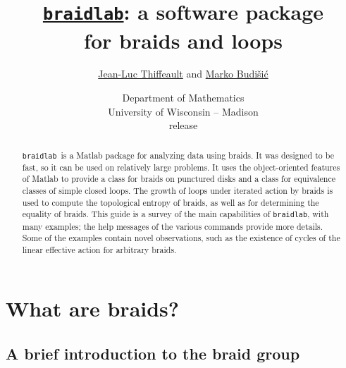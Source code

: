 \documentclass[12pt]{article}
\newcommand{\braidlab}{\texttt{braidlab}}%
\begin{document}

    {\lstset{frame=single,framerule=0pt}}
    {}

\lstset{style=braidlabStyle}


\title{\href{{https://github.com/jeanluct/braidlab}}{\braidlab}:
  a software package \\ for braids and loops}
\author{%
\href{https://people.math.wisc.edu/~thiffeault/}{Jean-Luc Thiffeault}
  and
\href{https://mbudisic.wordpress.com}{Marko Budi\v{s}i\'{c}}
}
\date{{\small Department of Mathematics\\ University of
    Wisconsin -- Madison} \\[10pt]
  release } %

\maketitle

\begin{abstract}
  \braidlab\ is a Matlab package for analyzing data using braids.  It was
  designed to be fast, so it can be used on relatively large problems.  It
  uses the object-oriented features of Matlab to provide a class for braids on
  punctured disks and a class for equivalence classes of simple closed loops.
  The growth of loops under iterated action by braids is used to compute the
  topological entropy of braids, as well as for determining the equality of
  braids.  This guide is a survey of the main capabilities of \braidlab, with
  many examples; the help messages of the various commands provide more
  details.  Some of the examples contain novel observations, such as the
  existence of cycles of the linear effective action for arbitrary braids.
\end{abstract}

\tableofcontents


\section{What are braids?}

\subsection{A brief introduction to the braid group}
\label{sec:braidgroup}
\end{document}
